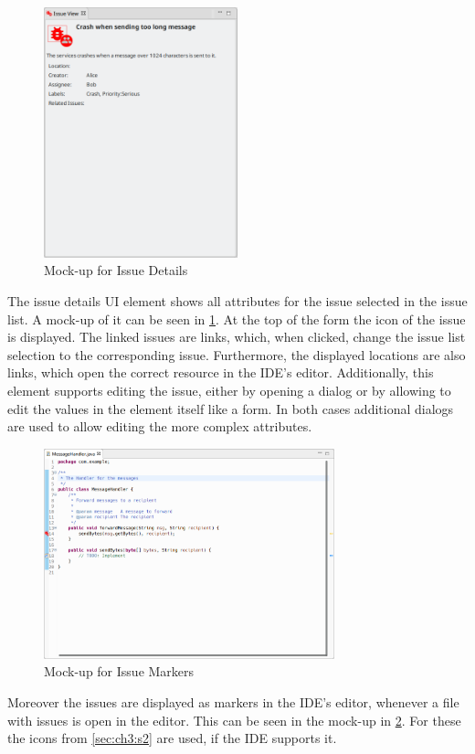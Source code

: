 \begin{figure}[!h]
	\centering
	\includegraphics[width=0.5\textwidth]{graphics/concept_mockup_issueDetails.png}
	\caption{Mock-up for Issue Details}
	\label{fig:c3:mockup_issueDetails}
\end{figure}
The issue details \gls{UI} element shows all attributes for the issue selected in the issue list.
A mock-up of it can be seen in \cref{fig:c3:mockup_issueDetails}.
At the top of the form the icon of the issue is displayed.
The linked issues are links, which, when clicked, change the issue list selection to the corresponding issue.
Furthermore, the displayed locations are also links, which open the correct resource in the \gls{IDE}'s editor.
Additionally, this element supports editing the issue, either by opening a dialog or by allowing to edit the values in the element itself like a form.
In both cases additional dialogs are used to allow editing the more complex attributes. 

\begin{figure}[!h]
	\centering
	\includegraphics[width=0.75\textwidth]{graphics/concept_mockup_issueMarker.png}
	\caption{Mock-up for Issue Markers}
	\label{fig:c3:mockup_issueMarkers}
\end{figure}
Moreover the issues are displayed as markers in the \gls{IDE}'s editor, whenever a file with issues is open in the editor.
This can be seen in the mock-up in \cref{fig:c3:mockup_issueMarkers}. 
For these the icons from \cref{sec:ch3:s2} are used, if the \gls{IDE} supports it.

